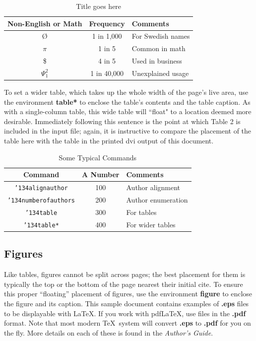 \documentclass{sig-alternate-05-2015}
\begin{document}
\begin{table}
	\centering
	\caption{Title goes here}
	\begin{tabular}{|c|c|l|}
		\hline
		Non-English or Math&Frequency&Comments\\ \hline
		\O & 1 in 1,000& For Swedish names\\ \hline
		$\pi$ & 1 in 5& Common in math\\ \hline
		\$ & 4 in 5 & Used in business\\ \hline
		$\Psi^2_1$ & 1 in 40,000& Unexplained usage\\
		\hline
	\end{tabular}
\end{table}

To set a wider table, which takes up the whole width of the page's live area, use the environment \textbf{table*} to enclose the table's contents and the table caption.  As with a single-column table, this wide table will ``float" to a location deemed more desirable. Immediately following this sentence is the point at which Table 2 is included in the input  file; again, it is instructive to compare the placement of the table here with the table in the printed dvi output of this document.

\begin{table}
	\centering
	\caption{Some Typical Commands}
	\begin{tabular}{|c|c|l|}
		\hline
		Command&A Number&Comments\\ \hline
		\texttt{{\char'134}alignauthor} & 100& Author alignment\\ \hline
		\texttt{{\char'134}numberofauthors}& 200& Author enumeration\\ \hline
		\texttt{{\char'134}table}& 300 & For tables\\ \hline
		\texttt{{\char'134}table*}& 400& For wider tables\\
		\hline
	\end{tabular}
\end{table}

\subsection{Figures}
Like tables, figures cannot be split across pages; the best placement for them is typically the top or the bottom of the page nearest their initial cite.  To ensure this proper ``floating'' placement of figures, use the environment \textbf{figure} to enclose the figure and its caption. This sample document contains examples of \textbf{.eps} files to be displayable with \LaTeX.  If you work with pdf\LaTeX, use files in the \textbf{.pdf} format.  Note that most modern \TeX\ system will convert \textbf{.eps} to \textbf{.pdf} for you on the fly.  More details on each of these is found in the \textit{Author's Guide}.
\end{document}
